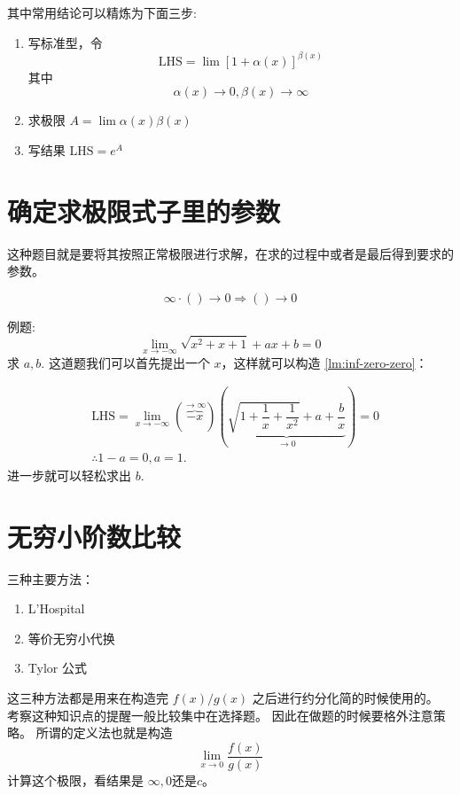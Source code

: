 其中常用结论可以精炼为下面三步:
\begin{enumerate}
	\item 写标准型，令
	\[\mbox{LHS} = \lim{} \left[ 1+\alpha(x)\right] ^{\beta(x)}\]
	其中 \[\alpha(x)\to0, \beta(x)\to\infty\]
	\item 求极限 $A = \lim \alpha(x)\beta(x)$
	\item 写结果 $\mbox{LHS} = e^{A}$
\end{enumerate}

\section{确定求极限式子里的参数}

这种题目就是要将其按照正常极限进行求解，在求的过程中或者是最后得到要求的参数。

\begin{lemma} \label{lm:inf-zero-zero}
	\begin{equation}
		\infty \cdot () \to 0 \Rightarrow () \to 0
	\end{equation}

\end{lemma}

例题:
\[
\lim_{x \to -\infty} \sqrt{x^2+x+1} +  ax + b = 0
\]
求 $a, b.$
这道题我们可以首先提出一个 $x$，这样就可以构造 \ref{lm:inf-zero-zero}：

\begin{align*}
	&\mbox{LHS} = \lim_{x \to -\infty} \left(\overbrace{-x}^{ \to \infty }\right)
	\left( 
	\underbrace{\sqrt{1+\dfrac{1}{x}+\dfrac{1}{x^2}} + a + \dfrac{b}{x}}_{\to 0}
	\right) = 0\\
	&\therefore 1-a = 0, a = 1.
\end{align*}
进一步就可以轻松求出 $b$.

\section{无穷小阶数比较}
三种主要方法：
\begin{enumerate}
	\item L'Hospital
	\item 等价无穷小代换
	\item Tylor 公式
\end{enumerate}

这三种方法都是用来在构造完 $f(x)/g(x)$ 之后进行约分化简的时候使用的。
考察这种知识点的提醒一般比较集中在选择题。
因此在做题的时候要格外注意策略。
所谓的定义法也就是构造
\[
    \lim_{x\to 0} \dfrac{f(x)}{g(x)}
\]
计算这个极限，看结果是 $\infty, 0$还是$c$。 

